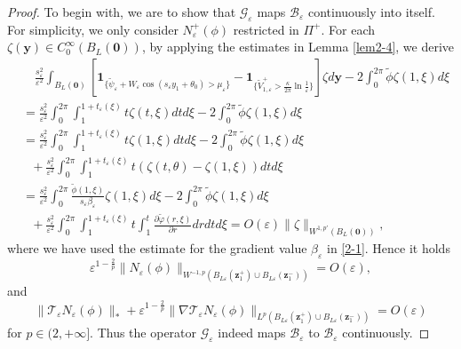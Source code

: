 \documentclass[12pt,reqno]{amsart}
\numberwithin{equation}{section}
\theoremstyle{definition}
\theoremstyle{remark}
\newcommand{\ep}{\varepsilon}
\begin{document}
\begin{proof}
		To begin with, we are to show that $\mathcal G_\varepsilon$ maps $\mathcal B_\varepsilon$ continuously into itself. For simplicity, we only consider $N_\varepsilon^+(\phi)$ restricted in $\Pi^+$. For each $\zeta(\boldsymbol y)\in C_0^\infty(B_{L}(\boldsymbol 0))$, by applying the estimates in Lemma \ref{lem2-4}, we derive
		\begin{align*}
				&\quad\frac{s_\varepsilon^2}{\varepsilon^2}\int_{B_L(\boldsymbol 0)}\left[\boldsymbol1_{\{\tilde\psi_\varepsilon+W_\ep\cos(s_\varepsilon y_1+\theta_0)>\mu_\varepsilon\}}-\boldsymbol 1_{\{\tilde V_{1,\varepsilon}^+>\frac{\kappa}{2\pi}\ln\frac{1}{\varepsilon}\}}\right]\zeta d\boldsymbol y-2\int_0^{2\pi}\tilde\phi \zeta(1,\xi)d\xi\\
				&=\frac{s_\varepsilon^2}{\varepsilon^2}\int_0^{2\pi}\int_1^{1+t_\varepsilon(\xi)}t\zeta(t,\xi)dtd\xi-2\int_0^{2\pi}\tilde\phi\zeta(1,\xi)d\xi\\
				&=\frac{s_\varepsilon^2}{\varepsilon^2}\int_0^{2\pi}\int_1^{1+t_\varepsilon(\xi)}t\zeta(1,\xi)dtd\xi-2\int_0^{2\pi}\tilde\phi\zeta(1,\xi)d\xi\\
				& \ \ \ +\frac{s_\varepsilon^2}{\varepsilon^2} \int_0^{2\pi}\int_1^{1+t_\varepsilon(\xi)}t(\zeta(t,\theta)-\zeta(1,\xi))dtd\xi\\
				&=\frac{s_\varepsilon^2}{\varepsilon^2}\int_0^{2\pi}\frac{\tilde\phi(1,\xi)}{s_\varepsilon\beta_\varepsilon} \zeta(1,\xi)d\xi-2\int_0^{2\pi}\tilde\phi\zeta(1,\xi)d\xi\\
				& \ \ \ +\frac{s_\varepsilon^2}{\varepsilon^2}\int_0^{2\pi}\int_1^{1+t_\varepsilon(\xi)}t\int_1^t\frac{\partial \tilde\varphi(r,\xi)}{\partial r}drdtd\xi=O(\varepsilon)\|\zeta\|_{W^{1,p'}(B_{L}(\boldsymbol 0))},
		\end{align*}
		where we have used the estimate for the gradient value $\beta_\varepsilon$ in \eqref{2-1}. Hence it holds
		\begin{equation*}
			\varepsilon^{1-\frac{2}{p}}\|N_\varepsilon(\phi)\|_{W^{-1,p}(B_{L\varepsilon}(\boldsymbol z_1^+)\cup B_{L\varepsilon}(\boldsymbol z_1^-))}=O(\varepsilon),
		\end{equation*}
		and
		\begin{equation*}
			\|\mathcal T_\varepsilon N_\varepsilon(\phi)\|_*+\varepsilon^{1-\frac{2}{p}}\|\nabla\mathcal T_\varepsilon N_\varepsilon(\phi)\|_{L^p(B_{L\varepsilon}(\boldsymbol z_1^+)\cup B_{L\varepsilon}(\boldsymbol z_1^-))}=O(\varepsilon)
		\end{equation*}
		for $p\in(2,+\infty]$. Thus the operator $\mathcal G_\varepsilon$ indeed maps $\mathcal B_\varepsilon$ to $\mathcal B_\varepsilon$ continuously.


\end{proof}
\end{document}
